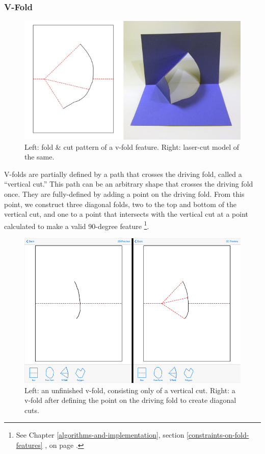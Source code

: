 \subsubsection{V-Fold}\label{v-fold}

\begin{figure}[htbp]
\centering
\includegraphics{figures/33_UI_Interface_Data_Structures/v.pdf}
\caption{Left: fold \& cut pattern of a v-fold feature. Right: laser-cut
model of the same.}
\end{figure}

V-folds are partially defined by a path that crosses the driving fold,
called a ``vertical cut.'' This path can be an arbitrary shape that
crosses the driving fold once. They are fully-defined by adding a point
on the driving fold. From this point, we construct three diagonal folds,
two to the top and bottom of the vertical cut, and one to a point that
intersects with the vertical cut at a point calculated to make a valid
90-degree feature \footnote{See Chapter
  \ref{algorithms-and-implementation}, section
  \ref{constraints-on-fold-features} ,
   on page
  \pageref{geometric-constraints}.}.

\begin{figure}[htbp]
\centering
\includegraphics{figures/33_UI_Interface_Data_Structures/vfold_before_after.png}
\caption{Left: an unfinished v-fold, consisting only of a vertical cut.
Right: a v-fold after defining the point on the driving fold to create
diagonal cuts.}
\end{figure}

